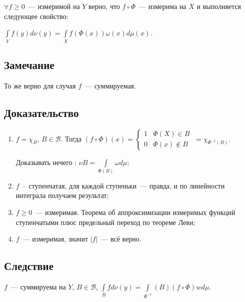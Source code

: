 \documentclass{article}
\begin{document}
        $\forall f \geqslant 0$~--- измеримой на $Y$ верно, что $f \circ \Phi$~--- измерима на $X$ и выполняется следующее свойство:
        
        $\int\limits_Y f(y) d \nu(y) = \int\limits_X f (\Phi(x)) \omega(x) d \mu(x)$.
            
        \subsection{Замечание}
        
            То же верно для случая $f$~--- суммируемая.
    
        \subsection{Доказательство}
        
            \begin{enumerate}
            
                \item $f = \chi_B$, $B \in \mathcal{B}$. Тогда $\left(f \circ \Phi \right)(x) = \begin{cases} 1 & \Phi(X) \in B \\ 0 & \Phi(x) \notin B \end{cases} \ = \chi_{\Phi^{-1}(B)}$.
                
                    Доказывать нечего \smiley{} : $\nu B = \int\limits_{\Phi(B)} \omega d \mu$;
                    
                \item $f$~-- ступенчатая, для каждой ступеньки~--- правда, и по линейности интеграла получаем результат;
                
                \item $f \geqslant 0$~--- измеримая. Теорема об аппроксимизации измеримых функций ступенчатыми плюс предельный переход по теореме Леви;
                
                \item $f$~--- измеримая, значит $|f|$~--- всё верно.
                
            \end{enumerate}
            
        \subsection{Следствие}
        
            $f$~--- суммируема на $Y$, $B \in \mathcal{B}$, $\int\limits_B f d \nu(y) = \int\limits_{\Phi^{-1}}(B) \left(f \circ \Phi\right) w d \mu$.
            
\end{document}
